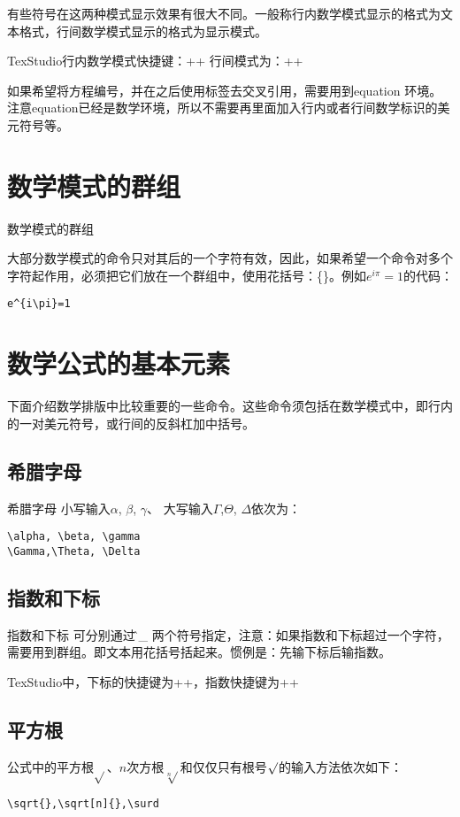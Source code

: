 有些符号在这两种模式显示效果有很大不同。一般称行内数学模式显示的格式为文本格式，行间数学模式显示的格式为显示模式。

TexStudio行内数学模式快捷键：++ 行间模式为：++

如果希望将方程编号，并在之后使用标签去交叉引用，需要用到equation 环境。注意equation已经是数学环境，所以不需要再里面加入行内或者行间数学标识的美元符号等。

\section{数学模式的群组}
数学模式的群组

大部分数学模式的命令只对其后的一个字符有效，因此，如果希望一个命令对多个字符起作用，必须把它们放在一个群组中，使用花括号：\{\}。例如$e^{i\pi}=1$的代码：
\begin{lstlisting}
e^{i\pi}=1
\end{lstlisting}

\section{数学公式的基本元素}

下面介绍数学排版中比较重要的一些命令。这些命令须包括在数学模式中，即行内的一对美元符号，或行间的反斜杠加中括号。

\subsection{希腊字母}

希腊字母 小写输入$\alpha$, $\beta$, $\gamma$、 大写输入$\Gamma$,$\Theta$, $\Delta$依次为：
\begin{lstlisting}
\alpha, \beta, \gamma
\Gamma,\Theta, \Delta
\end{lstlisting}
\subsection{指数和下标}

指数和下标 可分别通过\^和\_ 两个符号指定，注意：如果指数和下标超过一个字符，需要用到群组。即文本用花括号括起来。惯例是：\hei 先输下标后输指数\song 。

TexStudio中，下标的快捷键为++，指数快捷键为++

\subsection{平方根}
公式中的平方根$\sqrt{}$、$n$次方根$\sqrt[n]{}$和仅仅只有根号$\surd$的输入方法依次如下：
\begin{lstlisting}
\sqrt{},\sqrt[n]{},\surd
\end{lstlisting}

